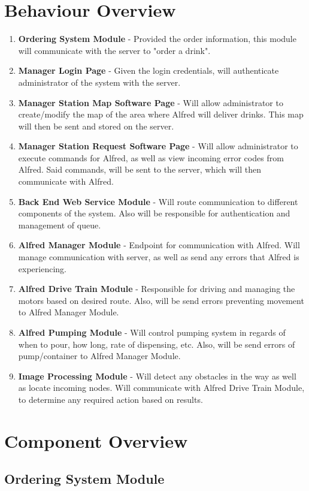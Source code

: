 \documentclass [10pt]{article}
\begin{document}
\section{Behaviour Overview}
\begin{enumerate}
	\item \textbf{Ordering System Module} - Provided the order information, this module will communicate with the server to "order a drink".
	\item \textbf{Manager Login Page} - Given the login credentials, will authenticate administrator of the system with the server.
	\item \textbf{Manager Station Map Software Page} - Will allow administrator to create/modify the map of the area where Alfred will deliver drinks. This map will then be sent and stored on the server.
	\item \textbf{Manager Station Request Software Page} - Will allow administrator to execute commands for Alfred, as well as view incoming error codes from Alfred. Said commands, will be sent to the server, which will then communicate with Alfred.
	\item \textbf{Back End Web Service Module} - Will route communication to different components of the system. Also will be responsible for authentication and management of queue. 
	\item \textbf{Alfred Manager Module} - Endpoint for communication with Alfred. Will manage communication with server, as well as send any errors that Alfred is experiencing.
	\item \textbf{Alfred Drive Train Module} - Responsible for driving and managing the motors based on desired route. Also, will be send errors preventing movement to Alfred Manager Module.
	\item \textbf{Alfred Pumping Module} - Will control pumping system in regards of when to pour, how long, rate of dispensing, etc. Also, will be send errors of pump/container to Alfred Manager Module.
	\item \textbf{Image Processing Module} - Will detect any obstacles in the way as well as locate incoming nodes. Will communicate with Alfred Drive Train Module, to determine any required action based on results.
\end{enumerate}

\section{Component Overview}
\subsection{Ordering System Module}
\end{document}
